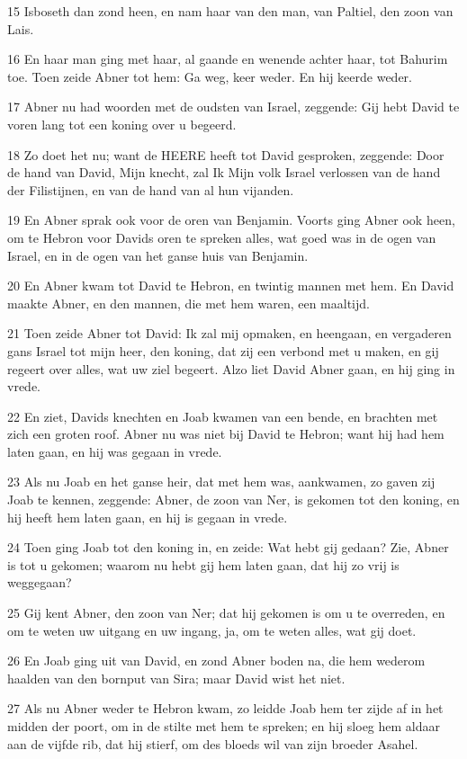 \par 15 Isboseth dan zond heen, en nam haar van den man, van Paltiel, den zoon van Lais.
\par 16 En haar man ging met haar, al gaande en wenende achter haar, tot Bahurim toe. Toen zeide Abner tot hem: Ga weg, keer weder. En hij keerde weder.
\par 17 Abner nu had woorden met de oudsten van Israel, zeggende: Gij hebt David te voren lang tot een koning over u begeerd.
\par 18 Zo doet het nu; want de HEERE heeft tot David gesproken, zeggende: Door de hand van David, Mijn knecht, zal Ik Mijn volk Israel verlossen van de hand der Filistijnen, en van de hand van al hun vijanden.
\par 19 En Abner sprak ook voor de oren van Benjamin. Voorts ging Abner ook heen, om te Hebron voor Davids oren te spreken alles, wat goed was in de ogen van Israel, en in de ogen van het ganse huis van Benjamin.
\par 20 En Abner kwam tot David te Hebron, en twintig mannen met hem. En David maakte Abner, en den mannen, die met hem waren, een maaltijd.
\par 21 Toen zeide Abner tot David: Ik zal mij opmaken, en heengaan, en vergaderen gans Israel tot mijn heer, den koning, dat zij een verbond met u maken, en gij regeert over alles, wat uw ziel begeert. Alzo liet David Abner gaan, en hij ging in vrede.
\par 22 En ziet, Davids knechten en Joab kwamen van een bende, en brachten met zich een groten roof. Abner nu was niet bij David te Hebron; want hij had hem laten gaan, en hij was gegaan in vrede.
\par 23 Als nu Joab en het ganse heir, dat met hem was, aankwamen, zo gaven zij Joab te kennen, zeggende: Abner, de zoon van Ner, is gekomen tot den koning, en hij heeft hem laten gaan, en hij is gegaan in vrede.
\par 24 Toen ging Joab tot den koning in, en zeide: Wat hebt gij gedaan? Zie, Abner is tot u gekomen; waarom nu hebt gij hem laten gaan, dat hij zo vrij is weggegaan?
\par 25 Gij kent Abner, den zoon van Ner; dat hij gekomen is om u te overreden, en om te weten uw uitgang en uw ingang, ja, om te weten alles, wat gij doet.
\par 26 En Joab ging uit van David, en zond Abner boden na, die hem wederom haalden van den bornput van Sira; maar David wist het niet.
\par 27 Als nu Abner weder te Hebron kwam, zo leidde Joab hem ter zijde af in het midden der poort, om in de stilte met hem te spreken; en hij sloeg hem aldaar aan de vijfde rib, dat hij stierf, om des bloeds wil van zijn broeder Asahel.
